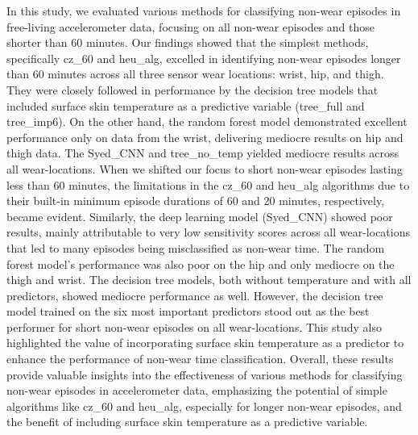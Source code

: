 \documentclass[
  10pt,
]{scrbook}
\begin{document}
In this study, we evaluated various methods for classifying non-wear
episodes in free-living accelerometer data, focusing on all non-wear
episodes and those shorter than 60 minutes. Our findings showed that the
simplest methods, specifically cz\_60 and heu\_alg, excelled in
identifying non-wear episodes longer than 60 minutes across all three
sensor wear locations: wrist, hip, and thigh. They were closely followed
in performance by the decision tree models that included surface skin
temperature as a predictive variable (tree\_full and tree\_imp6). On the
other hand, the random forest model demonstrated excellent performance
only on data from the wrist, delivering mediocre results on hip and
thigh data. The Syed\_CNN and tree\_no\_temp yielded mediocre results
across all wear-locations. When we shifted our focus to short non-wear
episodes lasting less than 60 minutes, the limitations in the cz\_60 and
heu\_alg algorithms due to their built-in minimum episode durations of
60 and 20 minutes, respectively, became evident. Similarly, the deep
learning model (Syed\_CNN) showed poor results, mainly attributable to
very low sensitivity scores across all wear-locations that led to many
episodes being misclassified as non-wear time. The random forest model's
performance was also poor on the hip and only mediocre on the thigh and
wrist. The decision tree models, both without temperature and with all
predictors, showed mediocre performance as well. However, the decision
tree model trained on the six most important predictors stood out as the
best performer for short non-wear episodes on all wear-locations. This
study also highlighted the value of incorporating surface skin
temperature as a predictor to enhance the performance of non-wear time
classification. Overall, these results provide valuable insights into
the effectiveness of various methods for classifying non-wear episodes
in accelerometer data, emphasizing the potential of simple algorithms
like cz\_60 and heu\_alg, especially for longer non-wear episodes, and
the benefit of including surface skin temperature as a predictive
variable.
\end{document}
